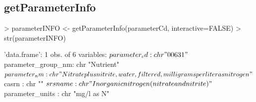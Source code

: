 \documentclass[a4paper,11pt]{article}
\begin{document}
\subsection{getParameterInfo}
\begin{Schunk}
\begin{Sinput}
> parameterINFO <- getParameterInfo(parameterCd, interactive=FALSE)
> str(parameterINFO)
\end{Sinput}
\begin{Soutput}
'data.frame':	1 obs. of  6 variables:
 $ parameter_cd      : chr "00631"
 $ parameter_group_nm: chr "Nutrient"
 $ parameter_nm      : chr "Nitrate plus nitrite, water, filtered, milligrams per liter as nitrogen"
 $ casrn             : chr ""
 $ srsname           : chr "Inorganic nitrogen (nitrate and nitrite)"
 $ parameter_units   : chr "mg/l as N"
\end{Soutput}
\end{Schunk}

\end{document}
